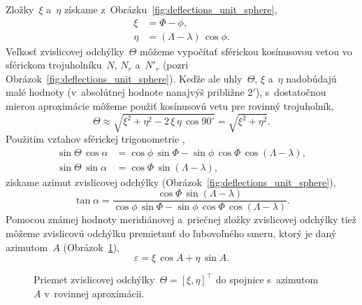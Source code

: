 \documentclass[a4paper,12pt]{book}
\begin{document}
Zložky~$\xi$ a~$\eta$ získame z~Obrázku~\ref{fig:deflections_unit_sphere},
%
\begin{equation}
\begin{split}
\xi  &= \Phi - \phi{,}\\
\eta &= (\Lambda - \lambda) \, \cos\phi{.}
\end{split}
\end{equation}
%
Veľkosť zvislicovej odchýlky~$\Theta$ môžeme vypočítať sférickou kosínusovou 
vetou vo sférickom trojuholníku~$N$, $N_r$ a~$N'_r$ (pozri 
Obrázok~\ref{fig:deflections_unit_sphere}).  Keďže ale uhly~$\Theta$, $\xi$ 
a~$\eta$ nadobúdajú malé hodnoty (v~absolútnej hodnote nanajvýš približne 
$2'$), s~dostatočnou mierou aproximácie môžeme použiť kosínusovú vetu pre 
rovinný trojuholník,
%
\begin{equation}
\label{eq:deflection_total}
\Theta \approx \sqrt{\xi^2 + \eta^2 - 2\, \xi \, \eta \, \cos 90^{\circ}} 
= \sqrt{\xi^2 + \eta^2}{.}
\end{equation}
%
Použitím vzťahov sférickej trigonometrie 
\parencite[napríklad][]{MoritzPhysicalGeodesy},
%
\begin{equation}
\label{eq:deflection_aux}
\begin{split}
\sin\Theta \, \cos\alpha &= \cos\phi \, \sin\Phi - \sin\phi \, \cos\Phi \, 
\cos(\Lambda - \lambda){,}\\
\sin\Theta \, \sin\alpha &= \cos\Phi \, \sin(\Lambda - \lambda),
\end{split}
\end{equation}
%
získame azimut zvislicovej odchýlky 
(Obrázok~\ref{fig:deflections_unit_sphere}),
%
\begin{equation}
\tan\alpha = \frac{\cos\Phi \, \sin(\Lambda - \lambda)}{\cos\phi \, \sin\Phi 
- \sin\phi \, \cos\Phi \, \cos(\Lambda - \lambda)}{.}
\end{equation}
%
Pomocou známej hodnoty meridiánovej a~priečnej zložky zvislicovej odchýlky tiež 
môžeme zvislicovú odchýlku premietnuť do ľubovoľného smeru, ktorý je daný 
azimutom~$A$ (Obrázok~\ref{fig:deflections_projection}),
%
\begin{equation}
\label{eq:deflection_vareps}
\varepsilon = \xi \, \cos A + \eta \, \sin A{.}
\end{equation}

\begin{figure}[bt]
\centering

\caption{Priemet zvislicovej odchýlky~$\Theta = [\xi, \eta]^\top$ do spojnice 
s~azimutom~$A$ v~rovinnej aproximácii.}
\label{fig:deflections_projection}
\end{figure}
\end{document}
